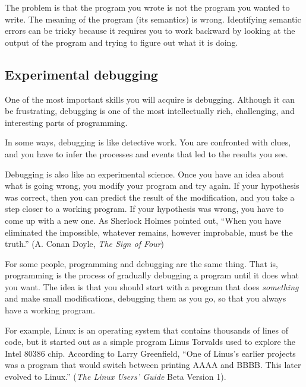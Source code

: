 \documentclass[10pt]{book}
\begin{document}
The problem is that the program you wrote is not the program you
wanted to write.  The meaning of the program (its semantics) is wrong.
Identifying semantic errors can be tricky because it requires you to work
backward by looking at the output of the program and trying to figure
out what it is doing.

\subsection{Experimental debugging}

One of the most important skills you will acquire is debugging.
Although it can be frustrating, debugging is one of the most
intellectually rich, challenging, and interesting parts of
programming.


In some ways, debugging is like detective work.  You are confronted
with clues, and you have to infer the processes and events that led
to the results you see.

Debugging is also like an experimental science.  Once you have an idea
about what is going wrong, you modify your program and try again.  If
your hypothesis was correct, then you can predict the result of the
modification, and you take a step closer to a working program.  If
your hypothesis was wrong, you have to come up with a new one.  As
Sherlock Holmes pointed out, ``When you have eliminated the
impossible, whatever remains, however improbable, must be the truth.''
(A. Conan Doyle, {\em The Sign of Four})


For some people, programming and debugging are the same thing.  That
is, programming is the process of gradually debugging a program until
it does what you want.  The idea is that you should start with a
program that does {\em something} and make small modifications,
debugging them as you go, so that you always have a working program.

For example, Linux is an operating system that contains thousands of
lines of code, but it started out as a simple program Linus Torvalds
used to explore the Intel 80386 chip.  According to Larry Greenfield,
``One of Linus's earlier projects was a program that would switch
between printing AAAA and BBBB.  This later evolved to Linux.''
({\em The Linux Users' Guide} Beta Version 1).

\end{document}
